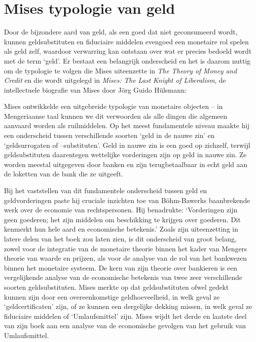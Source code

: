 \hypertarget{mises-typologie-van-geld}{%
\section{Mises\textquotesingle{} typologie van geld}\label{mises-typologie-van-geld}}

Door de bijzondere aard van geld, als een goed dat niet geconsumeerd wordt, kunnen geldsubstituten en fiduciaire middelen evengoed een monetaire rol spelen als geld zelf, waardoor verwarring kan ontstaan over wat er precies bedoeld wordt met de term `geld'. Er bestaat een belangrijk onderscheid en het is daarom nuttig om de typologie te volgen die Mises uiteenzette in \emph{The Theory of Money and Credit} en die wordt uitgelegd in \emph{Mises: The Last Knight of Liberalism},\autocite{169} de intellectuele biografie van Mises door Jörg Guido Hülsmann:

\begin{blockquotebox}
    Mises ontwikkelde een uitgebreide typologie van monetaire objecten -- in Mengeriaanse taal kunnen we dit verwoorden als alle dingen die algemeen aanvaard worden als ruilmiddelen. Op het meest fundamentele niveau maakte hij een onderscheid tussen verschillende soorten `geld in de nauwe zin' en `geldsurrogaten of --substituten'. Geld in nauwe zin is een goed op zichzelf, terwijl geldsubstituten daarentegen wettelijke vorderingen zijn op geld in nauwe zin. Ze worden meestal uitgegeven door banken en zijn terugbetaalbaar in echt geld aan de loketten van de bank die ze uitgeeft.
    \par\vspace{1em}\noindent
    Bij het vaststellen van dit fundamentele onderscheid tussen geld en geldvorderingen paste hij cruciale inzichten toe van Böhm-Bawerk\textquotesingle s baanbrekende werk over de economie van rechtspersonen. Hij benadrukte: `Vorderingen zijn geen goederen; het zijn middelen om beschikking te krijgen over goederen. Dit kenmerkt hun hele aard en economische betekenis.' Zoals zijn uiteenzetting in latere delen van het boek zou laten zien, is dit onderscheid van groot belang, zowel voor de integratie van de monetaire theorie binnen het kader van Mengers theorie van waarde en prijzen, als voor de analyse van de rol van het bankwezen binnen het monetaire systeem. De kern van zijn theorie over bankieren is een vergelijkende analyse van de economische betekenis van twee zeer verschillende soorten geldsubstituten. Mises merkte op dat geldsubstituten ofwel gedekt kunnen zijn door een overeenkomstige geldhoeveelheid, in welk geval ze `geldcertificaten' zijn, of ze kunnen een dergelijke dekking missen, in welk geval ze fiduciaire middelen of `Umlaufsmittel' zijn. Mises wijdt het derde en laatste deel van zijn boek aan een analyse van de economische gevolgen van het gebruik van Umlaufsmittel.\footnotemark
\end{blockquotebox}


